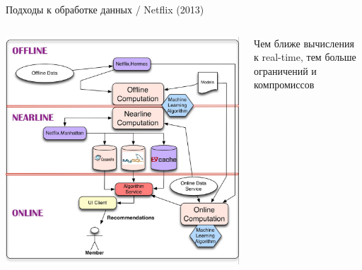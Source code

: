 \documentclass[11pt,aspectratio=169]{beamer}
\begin{document}
\begin{frame}{Подходы к обработке данных / Netflix (2013) \cite{NFLX}}
\begin{columns}
\begin{column}{0.6\textwidth}
   \begin{center}
		\includegraphics[scale=0.13]{images/netflix.png}
   \end{center}
\end{column}
\begin{column}{0.3\textwidth}
    \begin{tcolorbox}[colback=info!5,colframe=info!80,title=]
    Чем ближе вычисления к real-time, тем больше ограничений и компромиссов
    \end{tcolorbox}
\end{column}
\end{columns}

\end{frame}
\end{document}
